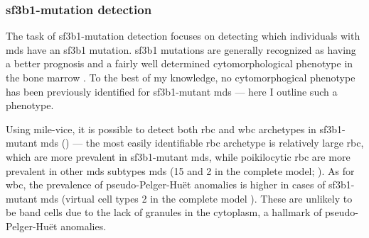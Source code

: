 \begin{figure}[!ht]
    \label{fig:rbc-disease-classification-examples}
\end{figure}

\begin{figure}[!ht]
    \label{fig:wbc-disease-classification-examples}
\end{figure}

\subsubsection{\ac{sf3b1}-mutation detection} 

The task of \ac{sf3b1}-mutation detection focuses on detecting which individuals with \ac{mds} have an \ac{sf3b1} mutation. \Ac{sf3b1} mutations are generally recognized as having a better prognosis and a fairly well determined cytomorphological phenotype in the bone marrow \cite{Malcovati2020-no,Hellstrom_Lindberg2015-zs,Malcovati2015-tz}. To the best of my knowledge, no cytomorphogical phenotype has been previously identified for \ac{sf3b1}-mutant \ac{mds} --- here I outline such a phenotype. 

Using \ac{mile-vice}, it is possible to detect both \ac{rbc} and \ac{wbc} archetypes in \ac{sf3b1}-mutant \ac{mds} () --- the most easily identifiable \ac{rbc} archetype is relatively large \ac{rbc}, which are more prevalent in \ac{sf3b1}-mutant \ac{mds}, while poikilocytic \ac{rbc} are more prevalent in other \ac{mds} subtypes \ac{mds} (15 and 2 in the complete model; ). As for \ac{wbc}, the prevalence of pseudo-Pelger-Huët anomalies is higher in cases of \ac{sf3b1}-mutant \ac{mds} (virtual cell types 2 in the complete model ). These are unlikely to be band cells due to the lack of granules in the cytoplasm, a hallmark of pseudo-Pelger-Huët anomalies.

